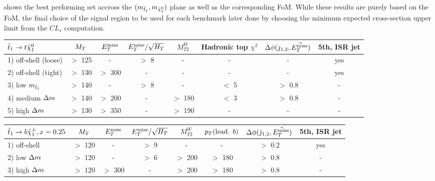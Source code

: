      shows the best performing set accross the
    $(m_{\tilde{t}_1},m_{\tilde{\chi}_1^0})$ plane as well as the corresponding FoM. While
    these results are purely based on the FoM, the final choice of the signal region to
    be used for each benchmark later done by choosing the minimum expected cross-section
    upper limit from the $CL_s$ computation.

\begin{table}[!ht]
{\footnotesize
\begin{center}
\hspace*{-0.8cm}
    \begin{tabular}{|l|ccccccc|}
    \hline
    $\tilde{t}_1 \rightarrow t\tilde{\chi}_1^0$ & $M_T$   & $E_T^\text{miss}$    & $E_T^\text{miss}/\sqrt{H_T}$  & $M_{T2}^W$ & Hadronic top $\chi^2$ & $\Delta\phi(j_{1,2},\vec{E_T^\text{miss}})$      &   5th, ISR jet \\
    \hline
    1) off-shell (loose)       & $>$ 125 & -       &   $>$ 8            &     -     & -             &          - &    yes        \\
    2) off-shell (tight)       & $>$ 130 & $>$ 300 &   -                &     -     & -        	    &          - &    yes        \\
    3) low    $m_{\tilde{t}_1}$  & $>$ 140 & -       &   $>$ 8            &     -     &  $<$ 5        &  $>$ 0.8   &    -          \\
    4) medium $\Delta m$        & $>$ 140 & $>$ 200 &   -                &  $>$ 180  &  $<$ 3        &  $>$ 0.8   &    -          \\
    5) high   $\Delta m$        & $>$ 130 & $>$ 350 &   -                &  $>$ 190  & -             &          - &    -          \\
        \hline
    \end{tabular}
    \hspace*{-0.5cm}
    \begin{tabular}{|l|ccccccc|}
    \hline
    $\tilde{t}_1 \rightarrow b\tilde{\chi}_1^\pm, x=0.25$   & $M_T$     & $E_T^\text{miss}$    & $E_T^\text{miss}/\sqrt{H_T}$ & $M_{T2}^W$ & $p_T(\text{lead. }b)$ & $\Delta\phi(j_{1,2},\vec{E_T^\text{miss}})$ & 5th, ISR jet  \\
    \hline
    1) off-shell        & $>$ 120   &  -       &    $>$  9       &     -      &   -                   &  $>$ 0.2      & yes           \\
    2) low    $\Delta m$ & $>$ 120   &  -       &    $>$  6       &  $>$ 200   & $>$ 180               &  $>$ 0.8      & -             \\
    3) high   $\Delta m$ & $>$ 120   & $>$ 300  &     -           &  $>$ 200   & $>$ 180               &  $>$ 0.8      & -             \\

\end{tabular}
\end{center}}
\end{table}
